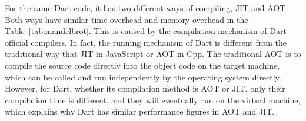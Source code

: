 For the same Dart code, it has two different ways of compiling, JIT and AOT\@.
Both ways have similar time overhead and memory overhead in the Table~\ref{tab:mandelbrot}.
This is caused by the compilation mechanism of Dart official compilers.
In fact, the running mechanism of Dart is different from the traditional way that JIT in JavaScript or AOT in Cpp.
The traditional AOT is to compile the source code directly into the object code on the target machine,
which can be called and run independently by the operating system directly.
However, for Dart, whether its compilation method is AOT or JIT, only their compilation time is different,
and they will eventually run on the virtual machine,
which explains why Dart has similar performance figures in AOT and JIT.

